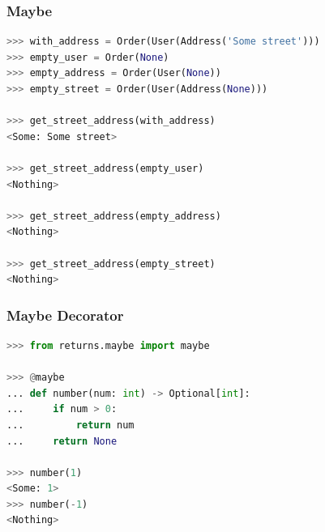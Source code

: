 \documentclass[envcountsect,10pt]{beamer}
\begin{document}
\begin{frame}[fragile]
    \frametitle{Maybe}

    \begin{lstlisting}[language=Python]
>>> with_address = Order(User(Address('Some street')))
>>> empty_user = Order(None)
>>> empty_address = Order(User(None))
>>> empty_street = Order(User(Address(None)))

>>> get_street_address(with_address)
<Some: Some street>

>>> get_street_address(empty_user)
<Nothing>

>>> get_street_address(empty_address)
<Nothing>

>>> get_street_address(empty_street)
<Nothing>
    \end{lstlisting}

\end{frame}

\begin{frame}[fragile]
    \frametitle{Maybe Decorator}

    \begin{lstlisting}[language=Python]
>>> from returns.maybe import maybe
        
>>> @maybe
... def number(num: int) -> Optional[int]:        
...     if num > 0:
...         return num
...     return None
        
>>> number(1)
<Some: 1>
>>> number(-1)
<Nothing>
    \end{lstlisting}

\end{frame}
\end{document}
